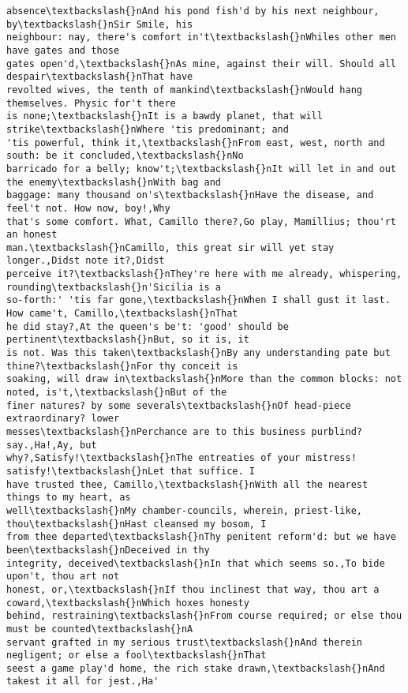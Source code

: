 \documentclass[11pt]{article}
\begin{document}
\begin{tcolorbox}[breakable, size=fbox, boxrule=.5pt, pad at break*=1mm, opacityfill=0]
\begin{Verbatim}[commandchars=\\\{\}]
absence\textbackslash{}nAnd his pond fish'd by his next neighbour, by\textbackslash{}nSir Smile, his
neighbour: nay, there's comfort in't\textbackslash{}nWhiles other men have gates and those
gates open'd,\textbackslash{}nAs mine, against their will. Should all despair\textbackslash{}nThat have
revolted wives, the tenth of mankind\textbackslash{}nWould hang themselves. Physic for't there
is none;\textbackslash{}nIt is a bawdy planet, that will strike\textbackslash{}nWhere 'tis predominant; and
'tis powerful, think it,\textbackslash{}nFrom east, west, north and south: be it concluded,\textbackslash{}nNo
barricado for a belly; know't;\textbackslash{}nIt will let in and out the enemy\textbackslash{}nWith bag and
baggage: many thousand on's\textbackslash{}nHave the disease, and feel't not. How now, boy!,Why
that's some comfort. What, Camillo there?,Go play, Mamillius; thou'rt an honest
man.\textbackslash{}nCamillo, this great sir will yet stay longer.,Didst note it?,Didst
perceive it?\textbackslash{}nThey're here with me already, whispering, rounding\textbackslash{}n'Sicilia is a
so-forth:' 'tis far gone,\textbackslash{}nWhen I shall gust it last. How came't, Camillo,\textbackslash{}nThat
he did stay?,At the queen's be't: 'good' should be pertinent\textbackslash{}nBut, so it is, it
is not. Was this taken\textbackslash{}nBy any understanding pate but thine?\textbackslash{}nFor thy conceit is
soaking, will draw in\textbackslash{}nMore than the common blocks: not noted, is't,\textbackslash{}nBut of the
finer natures? by some severals\textbackslash{}nOf head-piece extraordinary? lower
messes\textbackslash{}nPerchance are to this business purblind? say.,Ha!,Ay, but
why?,Satisfy!\textbackslash{}nThe entreaties of your mistress! satisfy!\textbackslash{}nLet that suffice. I
have trusted thee, Camillo,\textbackslash{}nWith all the nearest things to my heart, as
well\textbackslash{}nMy chamber-councils, wherein, priest-like, thou\textbackslash{}nHast cleansed my bosom, I
from thee departed\textbackslash{}nThy penitent reform'd: but we have been\textbackslash{}nDeceived in thy
integrity, deceived\textbackslash{}nIn that which seems so.,To bide upon't, thou art not
honest, or,\textbackslash{}nIf thou inclinest that way, thou art a coward,\textbackslash{}nWhich hoxes honesty
behind, restraining\textbackslash{}nFrom course required; or else thou must be counted\textbackslash{}nA
servant grafted in my serious trust\textbackslash{}nAnd therein negligent; or else a fool\textbackslash{}nThat
seest a game play'd home, the rich stake drawn,\textbackslash{}nAnd takest it all for jest.,Ha'

\end{Verbatim}
\end{tcolorbox}
\end{document}

